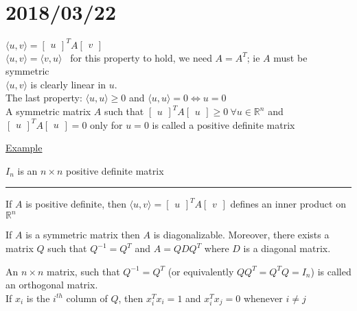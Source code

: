 \documentclass[12pt]{article}
\newcommand\m[1]{\begin{bmatrix}#1\end{bmatrix}}
\newcommand{\real}[0]{\mathbb{R}}
\newenvironment{proposition}{\block[Proposition]}{\endblock}
\newenvironment{theorem}{\block[Theorem]}{\endblock}
\newenvironment{remark}{\block[Remark]}{\endblock}
\newenvironment{definition}{\block[Definition]}{\endblock}
\newenvironment{example}{\shownto{-,compact}\underline{Example}\par}{\divider\endshownto}
\newcommand{\ang}[1]{\langle#1\rangle}
\newcommand{\divider}[0]{\par\textcolor{lightgray}{\rule{\textwidth}{0.1pt}}}
\begin{document}
	\section{2018/03/22}

	$\ang{u, v} = \m{u}^T A \m{v}$ \\
	$\ang{u, v} = \ang{v, u}$ \ for this property to hold, we need $A = A^T$; ie $A$ must be symmetric \\
	$\ang{u, v}$ is clearly linear in $u$. \\
	The last property: $\ang{u, u} \ge 0$ and $\ang{u, u} = 0 \Leftrightarrow u = 0$ \\
	
	\begin{definition}
		A symmetric matrix $A$ such that $\m{u}^T A \m{u} \ge 0 \ \forall u \in \real^n$ and $\m{u}^T A \m{u} = 0$ only for $u = 0$ is called a positive definite matrix
	\end{definition}

	\begin{example}
		$I_n$ is an $n \times n$ positive definite matrix
	\end{example}
	
	\begin{proposition}
		If $A$ is positive definite, then $\ang{u, v} = \m{u}^T A \m{v}$ defines an inner product on $\real^n$
	\end{proposition}
	
	\begin{theorem}
		If $A$ is a symmetric matrix then $A$ is diagonalizable. Moreover, there exists a matrix $Q$ such that $Q^{-1} = Q^T$ and $A = QDQ^T$ where $D$ is a diagonal matrix.
	\end{theorem}
	
	\begin{remark}
		An $n \times n$ matrix, such that $Q^{-1} = Q^T$ (or equivalently $QQ^T = Q^TQ = I_n$) is called an orthogonal matrix. \\
		If $x_i$ is the $i^{th}$ column of $Q$, then $x_i^Tx_i = 1$ and $x_i^Tx_j = 0$ whenever $i \ne j$
	\end{remark}																							
\end{document}
